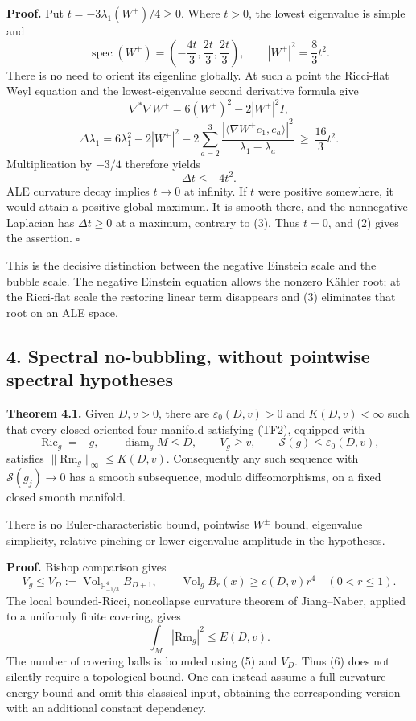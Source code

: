 \documentclass[
  11pt,
]{article}
\begin{document}
\textbf{Proof.} Put \(t=-3\lambda_1(W^+)/4\ge0\). Where \(t>0\), the
lowest eigenvalue is simple and \[
 \operatorname{spec}(W^+)
   =\left(-\frac{4t}{3},\frac{2t}{3},\frac{2t}{3}\right),
 \qquad |W^+|^2=\frac83t^2.                                \tag{2}
\] There is no need to orient its eigenline globally. At such a point
the Ricci-flat Weyl equation and the lowest-eigenvalue second derivative
formula give \[
 \nabla^*\nabla W^+=6(W^+)^2-2|W^+|^2I,
\] \[
 \Delta\lambda_1
 =6\lambda_1^2-2|W^+|^2
 -2\sum_{a=2}^3
 \frac{|\langle\nabla W^+ e_1,e_a\rangle|^2}
      {\lambda_1-\lambda_a}
 \ \ge\ \frac{16}{3}t^2.
\] Multiplication by \(-3/4\) therefore yields \[
                         \Delta t\le-4t^2.                 \tag{3}
\] ALE curvature decay implies \(t\to0\) at infinity. If \(t\) were
positive somewhere, it would attain a positive global maximum. It is
smooth there, and the nonnegative Laplacian has \(\Delta t\ge0\) at a
maximum, contrary to (3). Thus \(t=0\), and (2) gives the assertion.
\(\square\)

This is the decisive distinction between the negative Einstein scale and
the bubble scale. The negative Einstein equation allows the nonzero
Kähler root; at the Ricci-flat scale the restoring linear term
disappears and (3) eliminates that root on an ALE space.

\hypertarget{spectral-no-bubbling-without-pointwise-spectral-hypotheses}{%
\subsection{4. Spectral no-bubbling, without pointwise spectral
hypotheses}\label{spectral-no-bubbling-without-pointwise-spectral-hypotheses}}

\textbf{Theorem 4.1.} Given \(D,v>0\), there are
\(\varepsilon_0(D,v)>0\) and \(K(D,v)<\infty\) such that every closed
oriented four-manifold satisfying (TF2), equipped with \[
 \operatorname{Ric}_g=-g,\qquad
 \operatorname{diam}_gM\le D,\qquad V_g\ge v,
 \qquad \mathscr S(g)\le\varepsilon_0(D,v),                 \tag{4}
\] satisfies \(\|\mathrm{Rm}_g\|_\infty\le K(D,v)\). Consequently any
such sequence with \(\mathscr S(g_j)\to0\) has a smooth subsequence,
modulo diffeomorphisms, on a fixed closed smooth manifold.

There is no Euler-characteristic bound, pointwise \(W^\pm\) bound,
eigenvalue simplicity, relative pinching or lower eigenvalue amplitude
in the hypotheses.

\textbf{Proof.} Bishop comparison gives \[
 V_g\le V_D:=\operatorname{Vol}_{\mathbb H^4_{-1/3}}B_{D+1},
 \qquad \operatorname{Vol}_g B_r(x)\ge c(D,v)r^4
 \quad(0<r\le1).                                          \tag{5}
\] The local bounded-Ricci, noncollapse curvature theorem of
Jiang--Naber, applied to a uniformly finite covering, gives \[
                       \int_M|\mathrm{Rm}_g|^2\le E(D,v).  \tag{6}
\] The number of covering balls is bounded using (5) and \(V_D\). Thus
(6) does not silently require a topological bound. One can instead
assume a full curvature-energy bound and omit this classical input,
obtaining the corresponding version with an additional constant
dependency.
\end{document}
